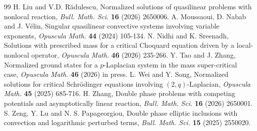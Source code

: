 \documentclass[10pt,a4paper]{amsart}
\numberwithin{equation}{section}
\begin{document}
\begin{thebibliography}{99}
 H. Liu and V.D. R\u adulescu, Normalized solutions of quasilinear problems with nonlocal reaction, {\it Bull. Math. Sci.} {\bf 16} (2026) 2650006.
 A. Moussaoui, D. Nabab and J. V\'elin, Singular quasilinear convective systems involving variable exponents, {\it Opuscula Math.} {\bf 44} (2024) 105-134.
 N. Nidhi and K. Sreenadh, Solutions with prescribed mass for a critical Choquard equation driven by a local-nonlocal operator, {\it Opuscula Math.} {\bf 46} (2026) 235-266.
 Y. Tao and J. Zhang, Normalized ground states for a $p$-Laplacian system in the mass super-critical case, {\it Opuscula Math.} {\bf 46} (2026) in press.
 L. Wei and Y. Song, Normalized solutions for critical Schrödinger equations involving $(2,q)$-Laplacian, {\it Opuscula Math.} {\bf 45} (2025) 685-716.
 H. Zhang, Double phase problems with competing potentials and asymptotically linear reaction, {\it Bull. Math. Sci.} {\bf 16} (2026) 2650001.
 S. Zeng, Y. Lu and N. S. Papageorgiou, Double phase elliptic inclusions with convection and logarithmic perturbed terms, {\it Bull. Math. Sci.} {\bf 15} (2025) 2550020.
\end{thebibliography}
\end{document}
